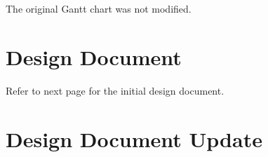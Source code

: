 \documentclass[10pt,journal,compsoc,draftclsnofoot]{IEEEtran}
\begin{document}
\begin{flushleft}
\begin{center}
\begin{table}[H]
\begin{tabular}{ | p{0.3\linewidth} | p{0.3\linewidth} | p{0.3\linewidth} | }
\end{tabular}
\newline
\label{table:RequirementsDocumentUpdate}
\end{table}
\end{center}

The original Gantt chart was not modified.

\newpage

\section{Design Document}

Refer to next page for the initial design document.

\newpage



\section{Design Document Update}


\end{flushleft}
\end{document}
